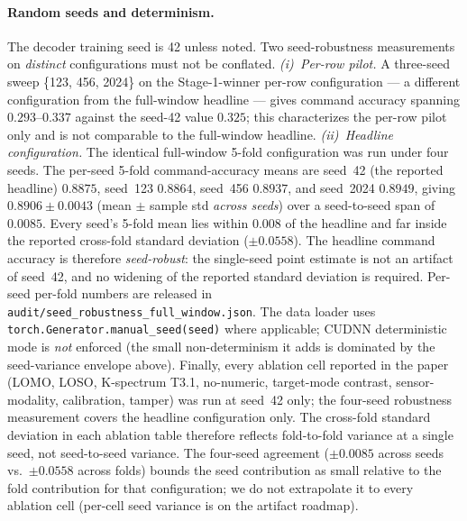 \documentclass[sensors,article,submit,moreauthors,pdftex]{Definitions/mdpi}
\begin{document}
\paragraph{Random seeds and determinism.}
\label{app3:repro-seeds}
The decoder training seed is 42 unless noted. Two seed-robustness measurements on \emph{distinct} configurations must not be conflated. \emph{(i)~Per-row
pilot.} A three-seed sweep \{123, 456, 2024\} on the Stage-1-winner per-row configuration --- a different
configuration from the full-window headline --- gives command accuracy spanning $0.293$--$0.337$ against the
seed-42 value $0.325$; this characterizes the per-row pilot only and is not comparable to the full-window
headline. \emph{(ii)~Headline configuration.} The identical full-window 5-fold configuration was run under
four seeds. The per-seed 5-fold command-accuracy means are seed~42 (the reported headline) $0.8875$, seed~123
$0.8864$, seed~456 $0.8937$, and seed~2024 $0.8949$, giving $0.8906 \pm 0.0043$ (mean $\pm$ sample std
\emph{across seeds}) over a seed-to-seed span of $0.0085$. Every seed's 5-fold mean lies within $0.008$ of the
headline and far inside the reported cross-fold standard deviation ($\pm 0.0558$). The headline command
accuracy is therefore \emph{seed-robust}: the single-seed point estimate is not an artifact of seed~42, and no
widening of the reported standard deviation is required. Per-seed per-fold numbers are released in
\texttt{audit/\allowbreak seed\_robustness\_full\_window.json}. The data loader uses
\texttt{torch.Generator.manual\_seed(seed)} where applicable; CUDNN deterministic mode is \emph{not} enforced
(the small non-determinism it adds is dominated by the seed-variance envelope above). Finally, every ablation
cell reported in the paper (LOMO, LOSO, K-spectrum T3.1, no-numeric, target-mode contrast, sensor-modality,
calibration, tamper) was run at seed~42 only; the four-seed robustness measurement covers the headline
configuration only. The cross-fold standard deviation in each ablation table therefore reflects fold-to-fold
variance at a single seed, not seed-to-seed variance. The four-seed agreement ($\pm 0.0085$ across seeds vs.\ $\pm 0.0558$ across folds) bounds the seed contribution as small relative to the fold contribution for that configuration; we do not extrapolate it to every ablation cell (per-cell seed variance is on the artifact roadmap).
\end{document}
